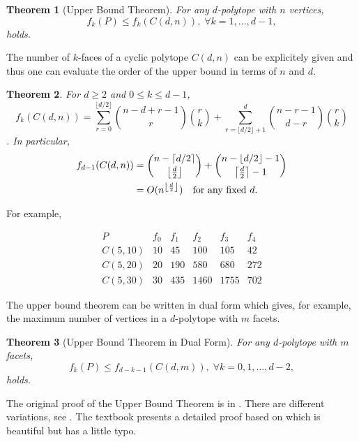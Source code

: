 \documentclass[a4paper,12pt]{article}
\newtheorem{theorem}{Theorem}
\newcommand{\FL}[1]{\left\lfloor #1  \right\rfloor}
\newcommand{\RF}[1]{\left\lceil #1  \right\rceil}
\begin{document}
\begin{theorem} [Upper Bound Theorem] \label{thm:MUB}
For any $d$-polytope with $n$ vertices,  
\[
  f_k(P)  \le f_{k}(C(d,n)),  \; \forall k=1, \ldots, d-1,
\]
holds.
\end{theorem}

The number of $k$-faces of a cyclic polytope $C(d,n)$ can
be explicitely given and thus one can evaluate the order of
the upper bound in terms of $n$ and $d$.

\begin{theorem} \label{thm:Cyclic}
For $d \ge 2$ and $0 \le k \le d-1$,
\[
 f_{k}(C(d,n)) = \sum_{r=0}^{\lfloor d/2 \rfloor}
\binom{n-d+r-1}{r} \binom{r}{k}
+
\sum_{r=\lfloor d/2 \rfloor+1}^{d}
\binom{n-r-1}{d-r} \binom{r}{k}
\].  In particular,
\begin{align} \label{polytope:FacetUB}
 f_{d-1}(C(d,n))  
  &= \binom{n-\RF{d/2}}{\left\lfloor \frac{d}{2} \right\rfloor} + \binom{n-\FL{d/2}-1}{\left\lceil \frac{d}{2} \right\rceil -1}\\
   & = O(n^{\left\lfloor \frac{d}{2} \right\rfloor}) \text{\quad for any fixed $d$}.
\end{align}
\end{theorem}


\noindent
For example,

\[
\begin{array}{lrrrrr}
P       & f_0 &  f_1 & f_2 &  f_3 & f_4 \\  
C(5,10) &  10  &  45 &   100 &   105  &  42\\
C(5,20) &  20  & 190 &   580 &   680  & 272\\
C(5,30) &  30  & 435 &  1460 &  1755  & 702
\end{array}
\]

The upper bound theorem can be written in dual  form which
gives, for example, the maximum number of vertices in
a $d$-polytope with $m$ facets.

\begin{theorem} [Upper Bound Theorem in Dual Form] \label{thm:MUBDual}
For any $d$-polytope with $m$ facets,  
\[
  f_k(P)  \le f_{d-k-1}(C(d,m)),  \; \forall k=0,1, \ldots, d-2,
\]
holds.
\end{theorem}


The original proof of the Upper Bound Theorem is in
\cite{m-mnfcp-70,ms-cpuc-71}.
There are different variations, 
see \cite{k-lpsasp-97,m-cg-94,z-lop-94}.  The textbook \cite[Chap 6]{f-pc-20} 
presents a detailed proof based on \cite{k-lpsasp-97} which is beautiful 
but has a little typo.
\end{document}
